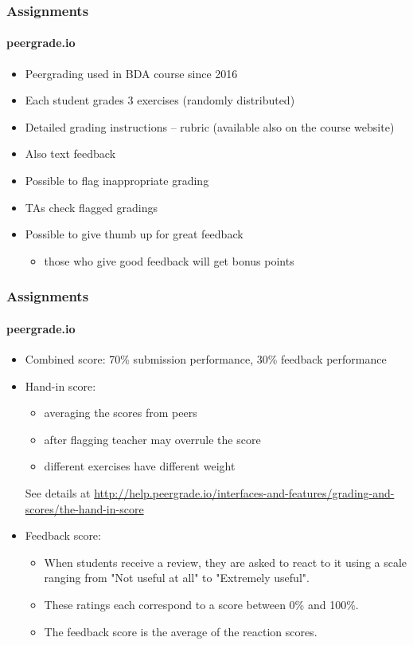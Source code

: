 \documentclass[english]{beamer}
\begin{document}
\begin{frame}
  \frametitle{Assignments}  %
  \framesubtitle{peergrade.io}
  \begin{itemize}
  \item Peergrading used in BDA course since 2016
  \item Each student grades 3 exercises (randomly distributed)
  \item Detailed grading instructions -- rubric (available also on the course website)
  \item Also text feedback
  \item Possible to flag inappropriate grading
  \item TAs check flagged gradings
  \item Possible to give thumb up for great feedback
    \begin{itemize}
    \item those who give good feedback will get bonus points
    \end{itemize}
  \end{itemize}
  
\end{frame}

\begin{frame}
  \frametitle{Assignments}  %
  \framesubtitle{peergrade.io}

  \begin{itemize}
  \item Combined score: 70\% submission performance, 30\% feedback performance
    \pause
  \item Hand-in score:
    \begin{itemize}
    \item averaging the scores from peers
    \item after flagging teacher may overrule the score
    \item different exercises have different weight
    \end{itemize}
    See details at \url{http://help.peergrade.io/interfaces-and-features/grading-and-scores/the-hand-in-score}
    \pause
  \item Feedback score:
    \begin{itemize}
    \item When students receive a review, they are asked to react to
      it using a scale ranging from "Not useful at all" to "Extremely
      useful".
    \item These ratings each correspond to a score between 0\% and 100\%.
    \item The feedback score is the average of the reaction scores.
    \end{itemize}
    
  \end{itemize}
  
\end{frame}
\end{document}

